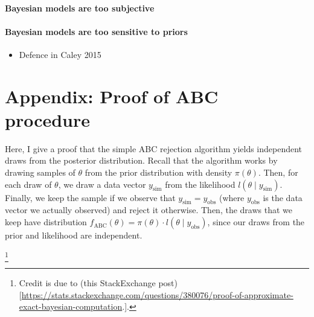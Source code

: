 \documentclass[
]{book}
\providecommand{\tightlist}{%
  \setlength{\itemsep}{0pt}\setlength{\parskip}{0pt}}
\begin{document}
\hypertarget{bayesian-models-are-too-subjective}{%
\subsubsection{Bayesian models are too subjective}\label{bayesian-models-are-too-subjective}}

\hypertarget{bayesian-models-are-too-sensitive-to-priors}{%
\subsubsection{Bayesian models are too sensitive to priors}\label{bayesian-models-are-too-sensitive-to-priors}}

\begin{itemize}
\tightlist
\item
  Defence in Caley 2015
\end{itemize}

\renewcommand{\baselinestretch}{1}\normalsize

\hypertarget{appendix-proof-of-abc-procedure}{%
\chapter{Appendix: Proof of ABC procedure}\label{appendix-proof-of-abc-procedure}}

Here, I give a proof that the simple ABC rejection algorithm yields independent draws from the posterior distribution. Recall that the algorithm works by drawing samples of \(\theta\) from the prior distribution with density \(\pi (\theta)\). Then, for each draw of \(\theta\), we draw a data vector \(y_{\text {sim}}\) from the likelihood \(l(\theta \mid y_{\text{sim}})\). Finally, we keep the sample if we observe that \(y_{\text{sim}} = y_{\text{obs}}\) (where \(y_{\text{obs}}\) is the data vector we actually observed) and reject it otherwise. Then, the draws that we keep have distribution \(f_{\text{ABC}}(\theta) = \pi(\theta) \cdot l(\theta \mid y_{\text{obs}})\), since our draws from the prior and likelihood are independent.

\footnote{Credit is due to (this StackExchange post){[}\url{https://stats.stackexchange.com/questions/380076/proof-of-approximate-exact-bayesian-computation}.{]}.}

  
\end{document}
